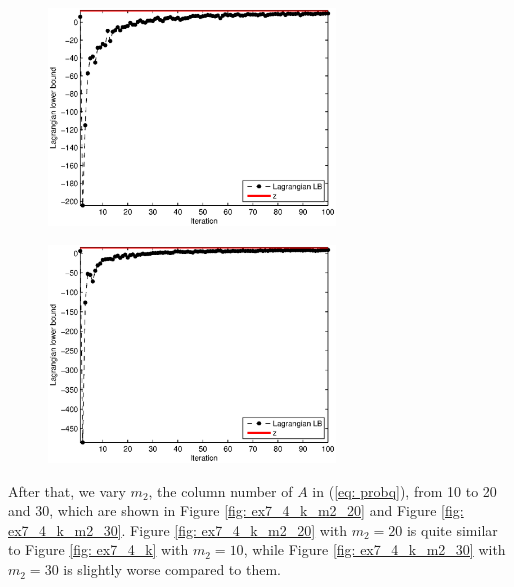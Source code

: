 \begin{figure}[!ht]
\centering
\begin{minipage}{0.49\textwidth}
\includegraphics[width=3.0in]{./p4/ex7_4_k_m1_25}
\label{fig: ex7_4_k_m1_25}
\end{minipage}
\begin{minipage}{0.49\textwidth}
\includegraphics[width=3.0in]{./p4/ex7_4_k_m1_35}
\label{fig: ex7_4_k_m1_35}
\end{minipage}
\end{figure}

After that, we vary $m_2$, the column number of $A$ in (\ref{eq: probq}), from 10 to 20 and 30, which are shown in Figure \ref{fig: ex7_4_k_m2_20} and Figure \ref{fig: ex7_4_k_m2_30}. Figure \ref{fig: ex7_4_k_m2_20} with $m_2=20$ is quite similar to Figure \ref{fig: ex7_4_k} with $m_2=10$, while Figure \ref{fig: ex7_4_k_m2_30} with $m_2=30$ is slightly worse compared to them.

